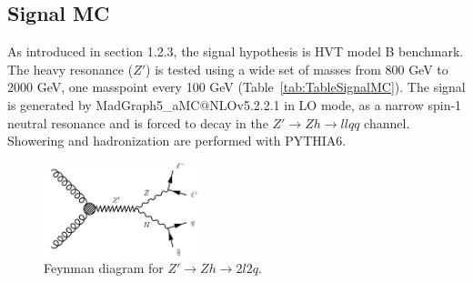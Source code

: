 \subsection{Signal MC}
As introduced in section 1.2.3, the signal hypothesis is HVT model B benchmark. The heavy resonance ($Z'$) is tested using a wide set of masses from 800 GeV to 2000 GeV, one masspoint every 100 GeV (Table~\ref{tab:TableSignalMC}). The signal is generated by MadGraph5\_aMC$@$NLOv5.2.2.1\cite{MG5} in LO mode, as a narrow spin-1 neutral resonance and is forced to decay in the $Z'\rightarrow Zh\rightarrow llqq$ channel. Showering and hadronization are performed with PYTHIA6\cite{PYTHIA}.
\begin{figure}[hbtp]
  \begin{center}
    \includegraphics[width=0.4\textwidth]{figure/CH3/ZPrimeTo2l2q.png}
  \end{center}
  \caption{\label{fig:ZPrime2l2q}Feynman diagram for $Z'\rightarrow Zh \rightarrow 2l2q.$}
\end{figure}
